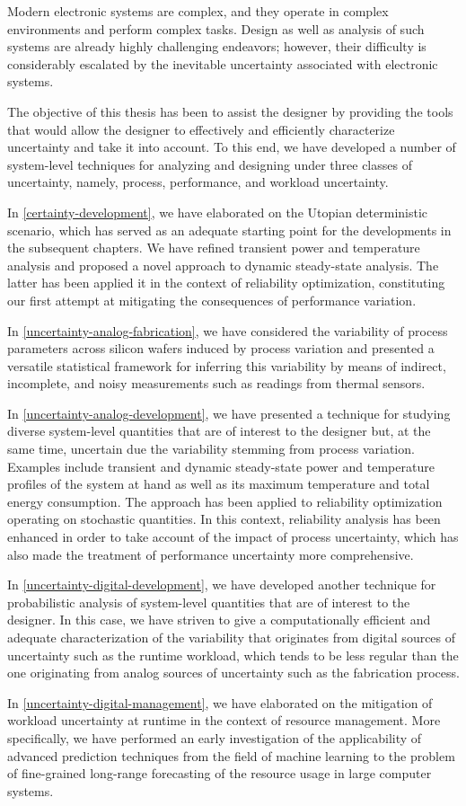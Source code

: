 Modern electronic systems are complex, and they operate in complex environments
and perform complex tasks. Design as well as analysis of such systems are
already highly challenging endeavors; however, their difficulty is considerably
escalated by the inevitable uncertainty associated with electronic systems.

The objective of this thesis has been to assist the designer by providing the
tools that would allow the designer to effectively and efficiently characterize
uncertainty and take it into account. To this end, we have developed a number of
system-level techniques for analyzing and designing under three classes of
uncertainty, namely, process, performance, and workload uncertainty.

In \cref{certainty-development}, we have elaborated on the Utopian deterministic
scenario, which has served as an adequate starting point for the developments in
the subsequent chapters. We have refined transient power and temperature
analysis and proposed a novel approach to dynamic steady-state analysis. The
latter has been applied it in the context of reliability optimization,
constituting our first attempt at mitigating the consequences of performance
variation.

In \cref{uncertainty-analog-fabrication}, we have considered the variability of
process parameters across silicon wafers induced by process variation and
presented a versatile statistical framework for inferring this variability by
means of indirect, incomplete, and noisy measurements such as readings from
thermal sensors.

In \cref{uncertainty-analog-development}, we have presented a technique for
studying diverse system-level quantities that are of interest to the designer
but, at the same time, uncertain due the variability stemming from process
variation. Examples include transient and dynamic steady-state power and
temperature profiles of the system at hand as well as its maximum temperature
and total energy consumption. The approach has been applied to reliability
optimization operating on stochastic quantities. In this context, reliability
analysis has been enhanced in order to take account of the impact of process
uncertainty, which has also made the treatment of performance uncertainty more
comprehensive.

In \cref{uncertainty-digital-development}, we have developed another technique
for probabilistic analysis of system-level quantities that are of interest to
the designer. In this case, we have striven to give a computationally efficient
and adequate characterization of the variability that originates from digital
sources of uncertainty such as the runtime workload, which tends to be less
regular than the one originating from analog sources of uncertainty such as the
fabrication process.

In \cref{uncertainty-digital-management}, we have elaborated on the mitigation
of workload uncertainty at runtime in the context of resource management.
More specifically, we have performed an early investigation of the applicability
of advanced prediction techniques from the field of machine learning to the
problem of fine-grained long-range forecasting of the resource usage in large
computer systems.
